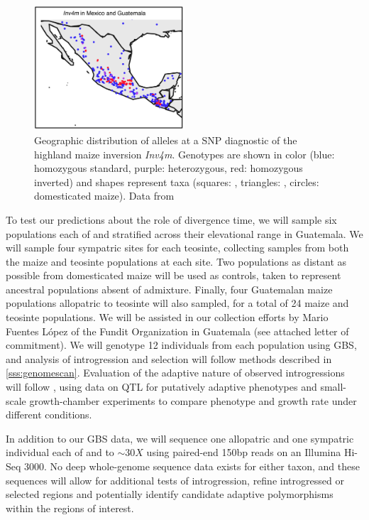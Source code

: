 \begin{figure}
  	\centering
  	\includegraphics[width=0.5\textwidth]{inv4m_lux}
  	\caption{Geographic distribution of alleles at a SNP diagnostic of the highland maize  inversion \emph{Inv4m}.  Genotypes are shown in color (blue: homozygous standard, purple: heterozygous, red: homozygous inverted) and shapes represent taxa (squares: \zm, triangles: \zp, circles: domesticated maize). Data from \citet{Fang2012}  } 
	\label{fig:inv4mmap}
\end{figure} 

To test our predictions about the role of divergence time, we will sample six populations each of \zl{} and \zh{} stratified across their elevational range in Guatemala.  
We will sample four sympatric sites for each teosinte, collecting samples from both the maize and teosinte populations at each site.
Two populations as distant as possible from domesticated maize will be used as controls, taken to represent ancestral populations absent of admixture.  
Finally, four Guatemalan maize populations allopatric to teosinte will also sampled, for a total of 24 maize and teosinte populations.
We will be assisted in our collection efforts by Mario Fuentes L\'{o}pez of the Fundit Organization in Guatemala (see attached letter of commitment).
We will genotype 12 individuals from each population using GBS, and analysis of introgression and selection will follow methods described in \ref{sss:genomescan}.  
Evaluation of the adaptive nature of observed introgressions will follow \citet{Hufford2013}, using data on QTL for putatively adaptive phenotypes \citep{omori2007qtl,mano2008linkage} and small-scale growth-chamber experiments to compare phenotype and growth rate under different conditions.

In addition to our GBS data, we will sequence one allopatric and one sympatric individual each of \zl{} and \zh{} to $\sim30X$ using paired-end 150bp reads on an Illumina Hi-Seq 3000.
No deep whole-genome sequence data exists for either taxon, and these sequences will allow for additional tests of introgression, refine introgressed or selected regions and potentially identify candidate adaptive polymorphisms within the regions of interest.

